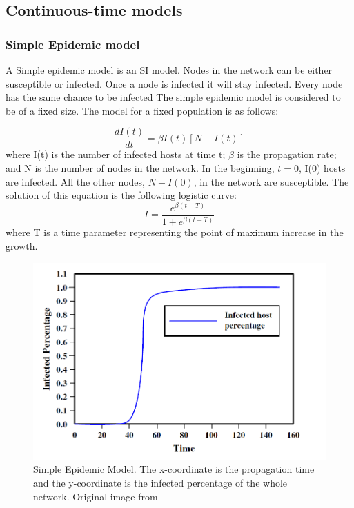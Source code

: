 \subsection{Continuous-time models}
\subsubsection{Simple Epidemic model}
A Simple epidemic model is an SI model. Nodes in the network can be either susceptible or infected. 
Once a node is infected it will stay infected. Every node has the same chance to be infected
The simple epidemic model is considered to be of a fixed size. The model for a fixed population is as follows:

\begin{equation}
\dfrac{d I(t)}{dt} = \beta I(t)[N-I(t)]
\end{equation} 
where I(t) is the number of infected hosts at time t; $\beta$ is the propagation rate; and N is the number of nodes in the network. In the beginning, $t=0$, I(0) hosts are infected. All the other nodes, $N - I(0)$, in the network are susceptible. 
The solution of this equation is the following logistic curve:
\begin{equation}
I = \dfrac{e^{\beta(t-T)}}{1+e^{\beta(t-T)}}
\end{equation}
where T is a time parameter representing the point of maximum increase in the
growth.\\


\begin{figure}[hbtp]
\centering
\includegraphics[scale=0.5]{Images/SEMmodel.png}
\caption{Simple Epidemic Model. The x-coordinate is the propagation time and the y-coordinate is the infected percentage of the whole network. Original image from \cite{OnWorms2005survey}}
\label{SEMmodel}
\end{figure}


